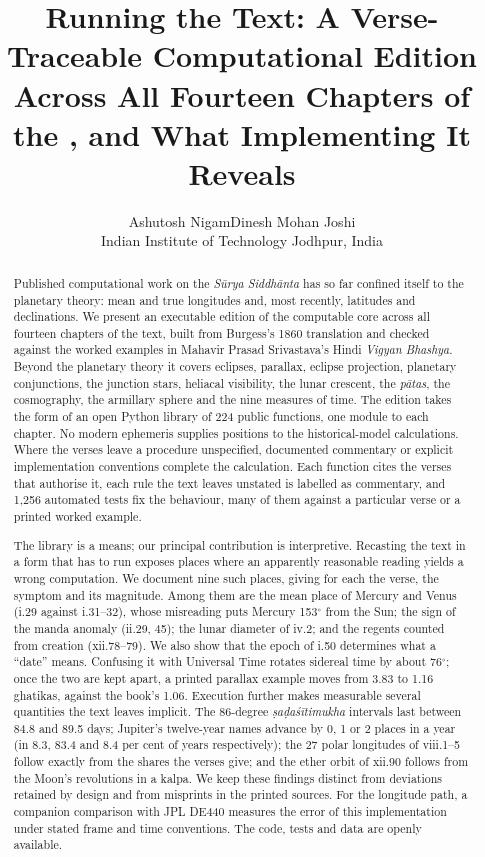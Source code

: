 \documentclass[11pt,a4paper]{article}
\title{Running the Text: A Verse-Traceable Computational Edition Across All Fourteen Chapters of the \SuSi{}, and What Implementing It Reveals}
\author{Ashutosh Nigam\quad Dinesh Mohan Joshi\\[6pt]
\small Indian Institute of Technology Jodhpur, India}
\date{}
\newcommand{\SuSi}{\textit{S\=urya Siddh\=anta}}
\begin{document}
\maketitle

\begin{abstract}
Published computational work on the \SuSi{} has so far confined itself to the planetary theory: mean and true longitudes and, most recently, latitudes and declinations. We present an executable edition of the computable core across all fourteen chapters of the text, built from Burgess's 1860 translation and checked against the worked examples in Mahavir Prasad Srivastava's Hindi \textit{Vigyan Bhashya}. Beyond the planetary theory it covers eclipses, parallax, eclipse projection, planetary conjunctions, the junction stars, heliacal visibility, the lunar crescent, the \textit{p\=atas}, the cosmography, the armillary sphere and the nine measures of time. The edition takes the form of an open Python library of 224 public functions, one module to each chapter. No modern ephemeris supplies positions to the historical-model calculations. Where the verses leave a procedure unspecified, documented commentary or explicit implementation conventions complete the calculation. Each function cites the verses that authorise it, each rule the text leaves unstated is labelled as commentary, and 1,256 automated tests fix the behaviour, many of them against a particular verse or a printed worked example.

The library is a means; our principal contribution is interpretive. Recasting the text in a form that has to run exposes places where an apparently reasonable reading yields a wrong computation. We document nine such places, giving for each the verse, the symptom and its magnitude. Among them are the mean place of Mercury and Venus (i.29 against i.31--32), whose misreading puts Mercury 153$^\circ$ from the Sun; the sign of the manda anomaly (ii.29, 45); the lunar diameter of iv.2; and the regents counted from creation (xii.78--79). We also show that the epoch of i.50 determines what a ``date'' means. Confusing it with Universal Time rotates sidereal time by about 76$^\circ$; once the two are kept apart, a printed parallax example moves from 3.83 to 1.16 ghatikas, against the book's 1.06. Execution further makes measurable several quantities the text leaves implicit. The 86-degree \textit{\d{s}a\d{d}a\'s\=itimukha} intervals last between 84.8 and 89.5 days; Jupiter's twelve-year names advance by 0, 1 or 2 places in a year (in 8.3, 83.4 and 8.4 per cent of years respectively); the 27 polar longitudes of viii.1--5 follow exactly from the shares the verses give; and the ether orbit of xii.90 follows from the Moon's revolutions in a kalpa. We keep these findings distinct from deviations retained by design and from misprints in the printed sources. For the longitude path, a companion comparison with JPL DE440 measures the error of this implementation under stated frame and time conventions. The code, tests and data are openly available.
\end{abstract}
\end{document}
